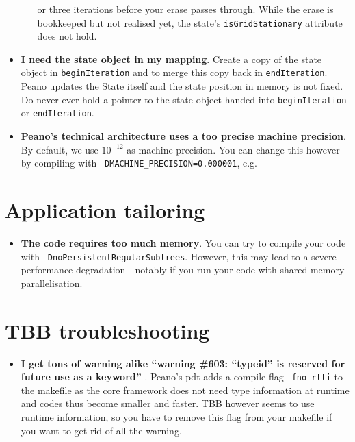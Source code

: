 \begin{itemize}
\begin{itemize}
    or three iterations before your erase passes through. While the erase is
    bookkeeped but not realised yet, the state's \texttt{isGridStationary}
    attribute does not hold.
  \end{itemize}
  \item \textbf{ I need the state object in my mapping}. Create a copy of the
  state object in \texttt{beginIteration} and to merge this copy back in \texttt{endIteration}. 
  Peano updates the State itself and the state position in memory is not fixed.
  Do never ever hold a pointer to the state object handed into
  \texttt{beginIteration} or \texttt{endIteration}.
  \item \textbf{Peano's technical architecture uses a too precise machine
  precision}. By default, we use $10^{-12}$ as machine precision. You can change
  this however by compiling with \linebreak
  \texttt{-DMACHINE\_PRECISION=0.000001}, e.g.
\end{itemize}


\section{Application tailoring}

\begin{itemize}
  \item \textbf{ The code requires too much memory}.
  You can try to compile your code with
  \linebreak \texttt{-DnoPersistentRegularSubtrees}.
  However, this may lead to a severe performance \linebreak
  degradation---notably if you run your code with shared memory parallelisation.
\end{itemize}

\section{TBB troubleshooting}

\begin{itemize}
  \item \textbf{ I get tons of warning alike ``warning \#603: ``typeid'' is reserved for future use as a keyword'' }.
  Peano's pdt adds a compile flag \texttt{-fno-rtti} to the makefile as the core framework does 
  not need type information at runtime and codes thus become smaller and faster. TBB however 
  seems to use runtime information, so you have to remove this flag from your makefile if you 
  want to get rid of all the warning. 
\end{itemize}

